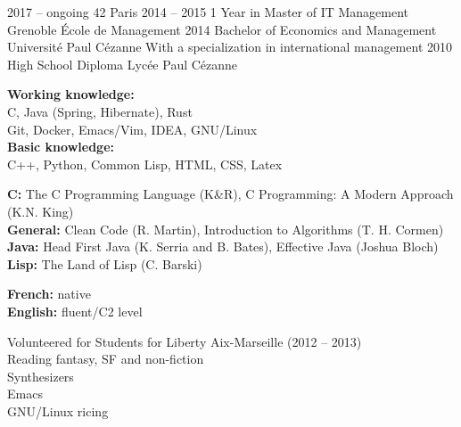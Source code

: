 \documentclass[10pt]{cv}
\begin{document}

\vspace{-3mm}
\begin{entrylist}
  \smallentry
    {2017 -- ongoing}
    {42 Paris}
    {}
  \smallentry
    {2014 -- 2015}
    {1 Year in Master of IT Management}
    {Grenoble École de Management}
  \entry
    {2014}
    {Bachelor of Economics and Management}
    {Université Paul Cézanne}
    {With a specialization in international management}
  \smallentry
    {2010}
    {High School Diploma}
    {Lycée Paul Cézanne}
\end{entrylist}

\vspace{-2mm}


\begin{minipage}[t]{0.49\textwidth}
\textbf{Working knowledge:}\\[0.5ex]
C, Java (Spring, Hibernate), Rust\\[0.5ex]
Git, Docker, Emacs/Vim, IDEA, GNU/Linux\\[1.2ex]
\textbf{Basic knowledge:}\\[0.5ex]
C++, Python, Common Lisp, HTML, CSS, Latex
\end{minipage}
\hfill
%
%
\begin{minipage}[t]{0.49\textwidth}
\textbf{C:} The C Programming Language (K\&R), C Programming: A Modern Approach (K.N. King)\\[1.2ex]
\textbf{General:} Clean Code (R. Martin), Introduction to Algorithms (T. H. Cormen)\\[1.2ex]
\textbf{Java:} Head First Java (K. Serria and B. Bates), Effective Java (Joshua Bloch)\\[1.2ex]
\textbf{Lisp:} The Land of Lisp (C. Barski)
\end{minipage}


\begin{minipage}[t]{0.49\textwidth}
\textbf{French:} native\\[1.5ex]
\textbf{English:} fluent/C2 level
\end{minipage}
\hfill
%
%
\begin{minipage}[t]{0.49\textwidth}
Volunteered for Students for Liberty Aix-Marseille (2012 -- 2013)\\[0.5ex]
Reading fantasy, SF and non-fiction\\[0.5ex]
Synthesizers\\[0.5ex]
Emacs\\[0.5ex]
GNU/Linux ricing


\end{minipage}
\end{document}
